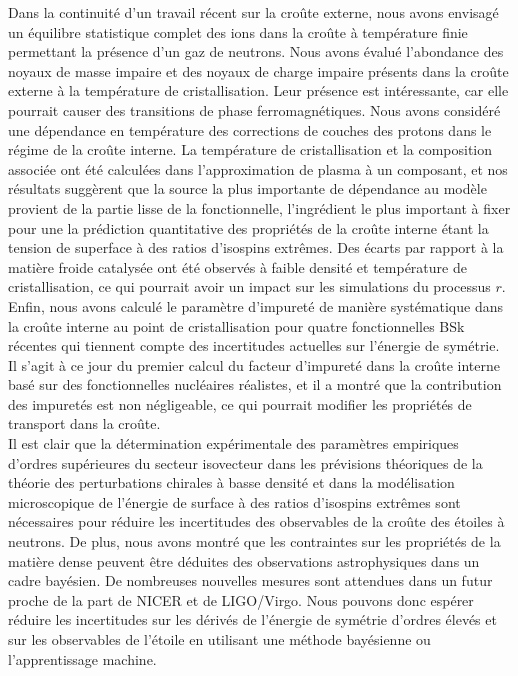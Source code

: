 Dans la continuité d'un travail récent sur la croûte externe, nous avons 
envisagé un équilibre statistique complet des ions dans la croûte à température 
finie permettant la présence d'un gaz de neutrons. Nous avons évalué 
l'abondance des noyaux de masse impaire et des noyaux de charge impaire 
présents dans la croûte externe à la température de cristallisation. 
Leur présence est intéressante, car elle pourrait causer des transitions de
phase ferromagnétiques.
%
Nous avons considéré une dépendance en température des corrections de couches 
des protons dans le régime de la croûte interne. La température de 
cristallisation et la composition associée ont été calculées dans 
l'approximation de plasma à un composant, et nos résultats suggèrent que la 
source la plus importante de dépendance au modèle provient de la partie lisse 
de la fonctionnelle, l'ingrédient le plus important à fixer pour une la 
prédiction quantitative des propriétés de la croûte interne étant la tension de 
superface à des ratios d'isospins extrêmes. 
%
Des écarts par rapport à la matière froide catalysée ont été observés à faible 
densité et température de cristallisation, ce qui pourrait avoir un impact sur 
les simulations du processus $r$.
Enfin, nous avons calculé le paramètre d'impureté de manière systématique dans
la croûte interne au point de cristallisation pour quatre fonctionnelles BSk
récentes qui tiennent compte des incertitudes actuelles sur l'énergie de 
symétrie. 
Il s'agit à ce jour du premier calcul du facteur d'impureté dans la croûte
interne basé sur des fonctionnelles nucléaires réalistes, et il a montré 
que la contribution des impuretés est non négligeable, ce qui pourrait modifier 
les propriétés de transport dans la croûte.
\\

Il est clair que la détermination expérimentale des paramètres empiriques
d'ordres supérieures du secteur isovecteur dans les prévisions théoriques de 
la théorie des perturbations chirales à basse densité et dans la modélisation
microscopique de l'énergie de surface à des ratios d'isospins extrêmes 
sont nécessaires pour réduire les incertitudes des observables de la croûte des
étoiles à neutrons. 
%
De plus, nous avons montré que les contraintes sur les propriétés de la matière 
dense peuvent être déduites des observations astrophysiques dans un cadre 
bayésien. 
De nombreuses nouvelles mesures sont attendues dans un futur proche de la part
de NICER et de LIGO/Virgo. 
Nous pouvons donc espérer réduire les incertitudes sur les dérivés de l'énergie 
de symétrie d'ordres élevés et sur les observables de l'étoile en utilisant une 
méthode bayésienne ou l'apprentissage machine.

